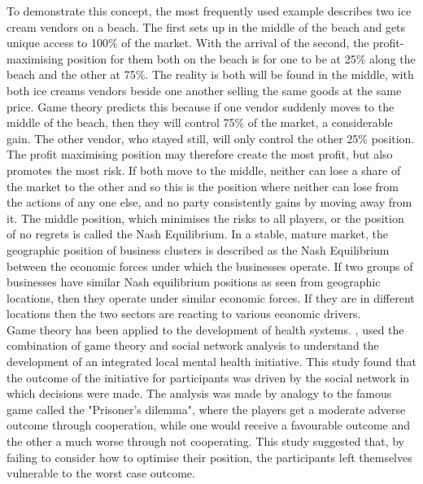 \documentclass[11pt,a4paper]{article}
\begin{document}
To demonstrate this concept, the most frequently used example describes two ice cream vendors on a beach. The first sets up in the middle of the beach and gets unique access to 100\% of the market. With the arrival of the second, the profit-maximising position for them both on the beach is for one to be at 25\% along the beach and the other at 75\%. The reality is both will be found in the middle, with both ice creams vendors beside one another selling the same goods at the same price. Game theory predicts this because if one vendor suddenly moves to the middle of the beach, then they will control 75\% of the market, a considerable gain. The other vendor, who stayed still, will only control the other 25\% position. The profit maximising position may therefore create the most profit, but also promotes the most risk. If both move to the middle, neither can lose a share of the market to the other and so this is the position where neither can lose from the actions of any one else, and no party consistently gains by moving away from it. The middle position, which minimises the risks to all players, or the position of no regrets is called the Nash Equilibrium. In a stable, mature market, the geographic position of business clusters is described as  the Nash Equilibrium between the economic forces under which the businesses operate. If two groups of businesses have similar Nash equilibrium positions as seen from geographic locations, then they operate under similar economic forces. If they are in different locations then the two sectors are reacting to various economic drivers. \\

Game theory has been applied to the development of health systems. \citep{dobson2004sustainable}, used the combination of game theory and social network analysis to understand the development of an integrated local mental health initiative. This study found that the outcome of the initiative for participants was driven by the social network in which decisions were made. The analysis was made by analogy to the famous game called the "Prisoner's dilemma", where the players get a moderate adverse outcome through cooperation, while one would receive a favourable outcome and the other a much worse through not cooperating. This study suggested that, by failing to consider how to optimise their position, the participants left themselves vulnerable to the worst case outcome. \\
\end{document}
